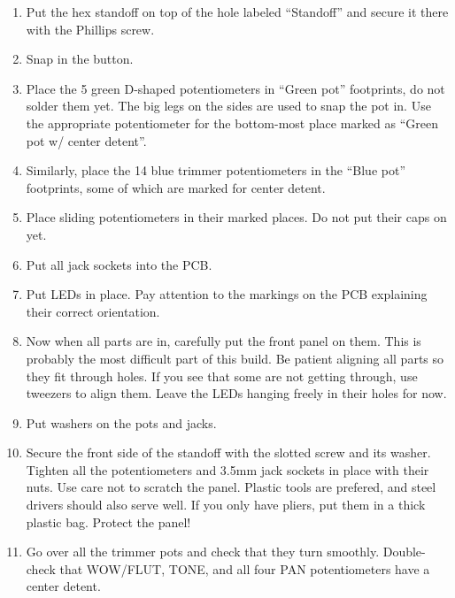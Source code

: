 \documentclass[10pt,a4paper,twocolumn]{article}
\begin{document}
\begin{enumerate}
  \item Put the hex standoff on top of the hole labeled ``Standoff'' and secure
    it there with the Phillips screw.
  \item Snap in the button.
  \item Place the 5 green D-shaped potentiometers in ``Green pot''
    footprints, do not solder them yet. The big legs on the sides are used to
    snap the pot in. Use the appropriate potentiometer for the bottom-most
    place marked as ``Green pot w/ center detent''.
  \item Similarly, place the 14 blue trimmer potentiometers in the ``Blue pot''
    footprints, some of which are marked for center detent.
  \item Place sliding potentiometers in their marked places. Do not put their
    caps on yet.
  \item Put all jack sockets into the PCB.
  \item Put LEDs in place. Pay attention to the markings on the PCB explaining
    their correct orientation.
  \item Now when all parts are in, carefully put the front panel on them.
    This is probably the most difficult part of this build. Be patient aligning
    all parts so they fit through holes. If you see that some are not getting
    through, use tweezers to align them. Leave the LEDs hanging freely in their
    holes for now.
  \item Put washers on the pots and jacks.
  \item Secure the front side of the standoff with the slotted screw and its
    washer. Tighten all the potentiometers and 3.5mm jack sockets in place with
    their nuts. Use care not to scratch the panel. Plastic tools are prefered,
    and steel drivers should also serve well. If you only have pliers, put them
    in a thick plastic bag. Protect the panel!
  \item Go over all the trimmer pots and check that they turn smoothly.
    Double-check that WOW/FLUT, TONE, and all four PAN potentiometers have a
    center detent.
\end{enumerate}
\end{document}

